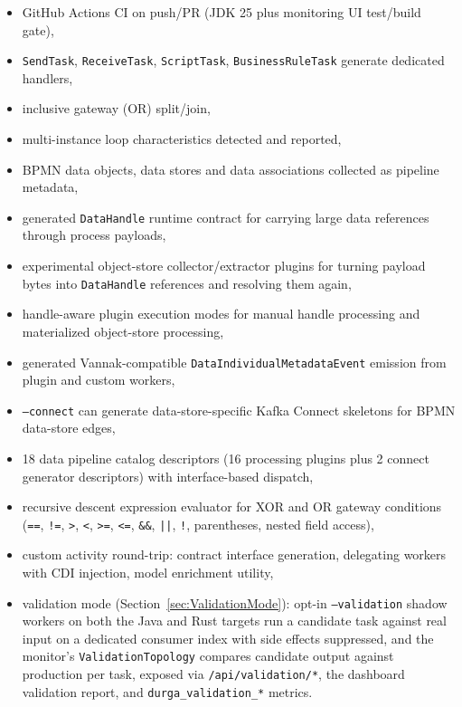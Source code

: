 \begin{itemize}
\item GitHub Actions CI on push/PR (JDK 25 plus monitoring UI test/build gate),
\item \texttt{SendTask}, \texttt{ReceiveTask}, \texttt{ScriptTask}, \texttt{BusinessRuleTask} generate dedicated handlers,
\item inclusive gateway (OR) split/join,
\item multi-instance loop characteristics detected and reported,
\item BPMN data objects, data stores and data associations collected as
      pipeline metadata,
\item generated \texttt{DataHandle} runtime contract for carrying large data
      references through process payloads,
\item experimental object-store collector/extractor plugins for turning payload
      bytes into \texttt{DataHandle} references and resolving them again,
\item handle-aware plugin execution modes for manual handle processing and
      materialized object-store processing,
\item generated Vannak-compatible \texttt{DataIndividualMetadataEvent} emission
      from plugin and custom workers,
\item \texttt{--connect} can generate data-store-specific Kafka Connect
      skeletons for BPMN data-store edges,
\item 18 data pipeline catalog descriptors (16 processing plugins plus 2 connect generator descriptors) with interface-based dispatch,
\item recursive descent expression evaluator for XOR and OR gateway conditions (\texttt{==}, \texttt{!=}, \texttt{>}, \texttt{<}, \texttt{>=}, \texttt{<=}, \texttt{\&\&}, \texttt{||}, \texttt{!}, parentheses, nested field access),
\item custom activity round-trip: contract interface generation, delegating workers with CDI injection, model enrichment utility,
\item validation mode (Section~\ref{sec:ValidationMode}): opt-in \texttt{--validation}
      shadow workers on both the Java and Rust targets run a candidate task against
      real input on a dedicated consumer index with side effects suppressed, and the
      monitor's \texttt{ValidationTopology} compares candidate output against
      production per task, exposed via \texttt{/api/validation/*}, the dashboard
      validation report, and \texttt{durga\_validation\_*} metrics.
\end{itemize}

